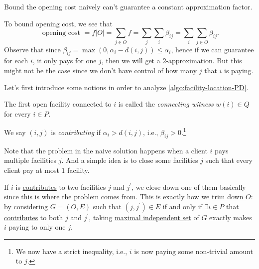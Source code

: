 \begin{remark}
	Bound the opening cost naively can't guarantee a constant approximation factor.
\end{remark}
\begin{explanation}
	To bound opening cost, we see that
	\[
		\text{ opening cost } = f \left\vert O \right\vert = \sum_{j\in O}f = \sum_{j}\sum_{i} \beta _{ij} = \sum_{i} \sum_{j\in O} \beta _{ij}.
	\]
	Observe that since \(\beta _{ij} = \max (0, \alpha _i - d(i, j)) \leq \alpha _i\), hence if we can guarantee for each \(i\), it only pays for one \(j\), then we will get a \(2\)-approximation. But this might not be the case since we don't have control of how many \(j\) that \(i\) is paying.
\end{explanation}

Let's first introduce some notions in order to analyze \autoref{algo:facility-location-PD}.

\begin{notation}\label{not:connecting-witness}
	The first open facility connected to \(i\) is called the \emph{connecting witness} \(w(i)\in Q\) for every \(i\in P\).
\end{notation}

\begin{notation}[Contributing]\label{not:contributing}
	We say \((i, j)\) is \emph{contributing} if \(\alpha _i > d(i, j)\), i.e., \(\beta _{ij} > 0\).\footnote{We now have a strict inequality, i.e., \(i\) is now paying some non-trivial amount to \(j\).}
\end{notation}

Note that the problem in the naive solution happens when a client \(i\) pays multiple facilities \(j\). And a simple idea is to close some facilities \(j\) such that every client pay at most \(1\) facility.

\begin{intuition}
	If \(i\) is \hyperref[not:contributing]{contributes} to two facilities \(j\) and \(j^\prime \), we close down one of them basically since this is where the problem comes from. This is exactly how we \hyperref[algo:facility-location-PD-comment]{trim down \(O\)}: by considering \(G = (O, E)\) such that \((j, j^\prime )\in E\) if and only if \(\exists i\in P\) that \hyperref[not:contributing]{contributes} to both \(j\) and \(j^\prime \), taking \hyperref[prb:max-strongly-independent-set]{maximal independent set} of \(G\) exactly makes \(i\) paying to only one \(j\).
\end{intuition}


